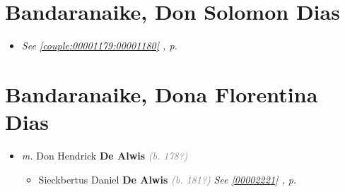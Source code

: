 \documentclass[10pt, openany]{book}
\begin{document}
\chapter{Bandaranaike, Don Solomon Dias}
\label{00001180}
\textcolor{slmaroon}{\textit{}}
\begin{itemize}
\item{\textcolor{slteal}{\textit{See  \autoref{couple:00001179:00001180} \textit{, p. \pageref{couple:00001179:00001180} }}}}
\end{itemize}
   
\chapter{Bandaranaike, Dona Florentina Dias}
\label{00002219}
\textcolor{slmaroon}{\textit{}}
\begin{itemize}
\item{\textit{m.} Don Hendrick \textbf{De Alwis} \textcolor{gray}{\textit{(b. 178?)}}   \label{couple:00002219:00002220} \begin{itemize}
\item{Sieckbertus Daniel \textbf{De Alwis} \textcolor{gray}{\textit{(b. 181?)}} \textcolor{slteal}{\textit{See  \autoref{00002221} \textit{, p. \pageref{00002221} }}}}
\end{itemize}}
\end{itemize}
   
\end{document}
